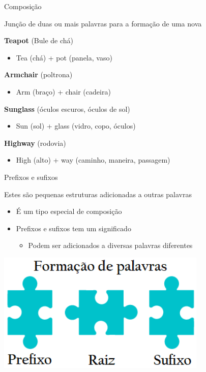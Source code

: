 \documentclass[compress,mathserif,xcolor=table]{beamer}
\begin{document}

\begin{frame}{Composição}

Junção de duas ou mais palavras para a formação de uma nova

\vspace{0.5cm}

\textbf{Teapot} (Bule de chá)
\begin{itemize}
    \item Tea (chá) + pot (panela, vaso)
\end{itemize}

\textbf{Armchair} (poltrona)
\begin{itemize}
    \item Arm (braço) + chair (cadeira)
\end{itemize}

\textbf{Sunglass} (óculos escuros, óculos de sol)
\begin{itemize}
    \item Sun (sol) + glass (vidro, copo, óculos)
\end{itemize}

\textbf{Highway} (rodovia)
\begin{itemize}
    \item High (alto) + way (caminho, maneira, passagem)
\end{itemize}

\end{frame}


\begin{frame}{Prefixos e sufixos}

Estes são pequenas estruturas adicionadas a outras palavras
\begin{itemize}
    \item É um tipo especial de composição
    \item Prefixos e sufixos tem um significado
    \begin{itemize}
        \item Podem ser adicionados a diversas palavras diferentes
    \end{itemize}
\end{itemize}

\vspace{0.75cm}

\centering \includegraphics[width=0.75\textwidth]{images/formacao_palavras.png}
\end{frame}
\end{document}
